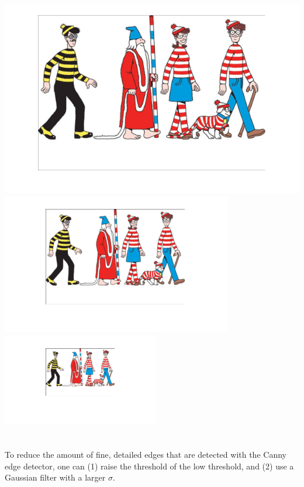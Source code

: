 \documentclass[11pt]{article}
\begin{document}
\\
\includegraphics[scale=0.5]{waldoPy1}
\\
\includegraphics[scale=0.5]{waldoPy2}
\\
\includegraphics[scale=0.5]{waldoPy3}

\section{}
To reduce the amount of fine, detailed edges that are detected with the Canny edge detector, one can (1) raise the threshold of the low threshold, and (2) use a Gaussian filter with a larger $\sigma$.
\end{document}
